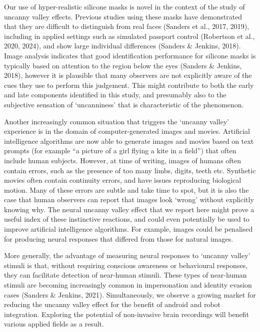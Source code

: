 \documentclass[
]{article}
\begin{document}
Our use of hyper-realistic silicone masks is novel in the context of the study of uncanny valley effects. Previous studies using these masks have demonstrated that they are difficult to distinguish from real faces (Sanders et al., 2017, 2019), including in applied settings such as simulated passport control (Robertson et al., 2020, 2024), and show large individual differences (Sanders \& Jenkins, 2018). Image analysis indicates that good identification performance for silicone masks is typically based on attention to the region below the eyes (Sanders \& Jenkins, 2018), however it is plausible that many observers are not explicitly aware of the cues they use to perform this judgement. This might contribute to both the early and late components identified in this study, and presumably also to the subjective sensation of `uncanniness' that is characteristic of the phenomenon.

Another increasingly common situation that triggers the `uncanny valley' experience is in the domain of computer-generated images and movies. Artificial intelligence algorithms are now able to generate images and movies based on text prompts (for example ``a picture of a girl flying a kite in a field'') that often include human subjects. However, at time of writing, images of humans often contain errors, such as the presence of too many limbs, digits, teeth etc. Synthetic movies often contain continuity errors, and have issues reproducing biological motion. Many of these errors are subtle and take time to spot, but it is also the case that human observers can report that images look `wrong' without explicitly knowing why. The neural uncanny valley effect that we report here might prove a useful index of these instinctive reactions, and could even potentially be used to improve artificial intelligence algorithms. For example, images could be penalised for producing neural responses that differed from those for natural images.

More generally, the advantage of measuring neural responses to `uncanny valley' stimuli is that, without requiring conscious awareness or behavioural responses, they can facilitate detection of near-human stimuli. These types of near-human stimuli are becoming increasingly common in impersonation and identity evasion cases (Sanders \& Jenkins, 2021). Simultaneously, we observe a growing market for reducing the uncanny valley effect for the benefit of android and robot integration. Exploring the potential of non-invasive brain recordings will benefit various applied fields as a result.
\end{document}
